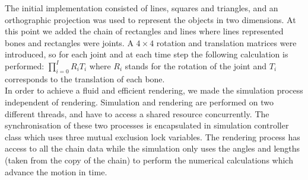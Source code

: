 \documentclass[paper=a4, fontsize=11pt]{scrartcl} %
\numberwithin{equation}{section} %
\numberwithin{figure}{section} %
\numberwithin{table}{section} %
\begin{document}
The initial implementation consisted of lines, squares and triangles, and an orthographic projection was used to represent the objects in two dimensions. 
At this point we added the chain of rectangles and lines where lines represented bones and rectangles were joints. A \(4 \times 4\) rotation and translation matrices were introduced, so for each joint and at each time step the following calculation is performed:  \(\prod_{i=0}^I R_i T_i\) where \(R_i\) stands for the rotation of the joint and \(T_i\) corresponds to the translation of each bone. \\

%


%
%	
%		
%	

In order to achieve a fluid and efficient rendering, we made the simulation process independent of rendering. Simulation and rendering are performed on two different threads, and have to access a shared resource concurrently. The synchronisation of these two processes is encapsulated in simulation controller class which uses three mutual exclusion lock variables. The rendering process has access to all the chain data while the simulation only uses the angles and lengths (taken from the copy of the chain) to perform the numerical calculations which advance the motion in time. \\
\end{document}
